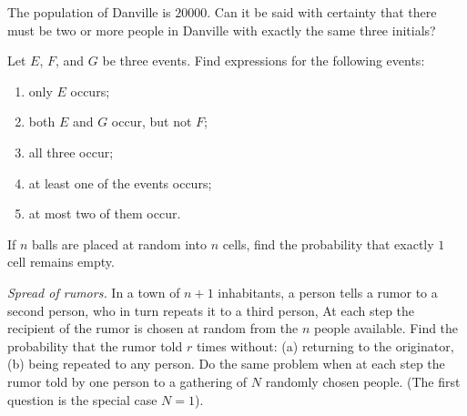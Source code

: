 \begin{problem}[DasGupta, 1.5]
  The population of Danville is \(20000\). Can it be said with certainty
  that there must be two or more people in Danville with exactly the same
  three initials?
\end{problem}
\begin{solution}
\end{solution}
\newpage

\begin{problem}[DasGupta, 1.7]
  Let \(E\), \(F\), and \(G\) be three events. Find expressions for the
  following events:
  \begin{enumerate}[label=(\alph*)]
  \item only \(E\) occurs;
  \item both \(E\) and \(G\) occur, but not \(F\);
  \item all three occur;
  \item at least one of the events occurs;
  \item at most two of them occur.
  \end{enumerate}
\end{problem}
\begin{solution}

\end{solution}
\newpage

\begin{problem}
  If \(n\) balls are placed at random into \(n\) cells, find the
  probability that exactly \(1\) cell remains empty.
\end{problem}
\begin{solution}

\end{solution}
\newpage

\begin{problem}
  \emph{Spread of rumors.} In a town of \(n+1\) inhabitants, a person tells
  a rumor to a second person, who in turn repeats it to a third person,
  \etc{} At each step the recipient of the rumor is chosen at random from the
  \(n\) people available. Find the probability that the rumor told \(r\)
  times without: (a) returning to the originator, (b) being repeated to any
  person. Do the same problem when at each step the rumor told by one
  person to a gathering of \(N\) randomly chosen people. (The first
  question is the special case \(N=1\)).
\end{problem}
\begin{solution}

\end{solution}
\newpage

